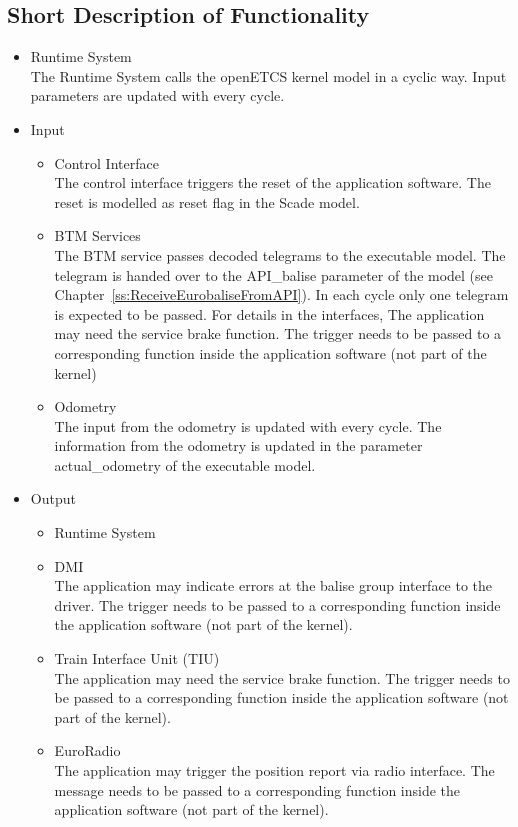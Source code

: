 \documentclass{template/openetcs_report}
\begin{document}
\subsection{Short Description of Functionality}

\begin{itemize}
\item Runtime System\\
The Runtime System calls the openETCS kernel model in a cyclic way. Input parameters are updated with every cycle.
\item Input
\begin{itemize}
\item Control Interface\\
The control interface triggers the reset of the application software. The reset is modelled as reset flag in the Scade model.

\item BTM Services\\
The BTM service passes decoded telegrams to the executable model. The telegram is handed over to the API\_balise parameter of the model (see Chapter~\ref{ss:ReceiveEurobaliseFromAPI}). In each cycle only one telegram is expected to be passed. For details in the interfaces, The application may need the service brake function. The trigger needs to be passed to a corresponding function inside the application software (not part of the kernel)

\item Odometry\\
The input from the odometry is updated with every cycle. The information from the odometry is updated in the parameter actual\_odometry of the executable model.
\end{itemize}

\item Output
\begin{itemize}
\item Runtime System\\
\item DMI\\
The application may indicate errors at the balise group interface to the driver. The trigger needs to be passed to a corresponding function inside the application software (not part of the kernel).
\item Train Interface Unit (TIU)\\
The application may need the service brake function. The trigger needs to be passed to a corresponding function inside the application software (not part of the kernel).
\item EuroRadio\\
The application may trigger the position report via radio interface. The message needs to be passed to a corresponding function inside the application software (not part of the kernel).
\end{itemize}

\end{itemize}
\end{document}
